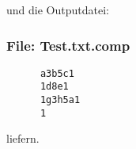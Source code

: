 und die Outputdatei:

\subsubsection*{File: Test.txt.comp}
\begin{verbatim}
      a3b5c1
      1d8e1
      1g3h5a1
      1
\end{verbatim}

liefern.

\osueguidelinesone



